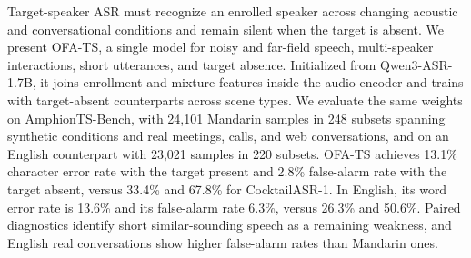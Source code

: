 Target-speaker ASR must recognize an enrolled speaker across changing acoustic and conversational conditions and remain silent when the target is absent.
We present OFA-TS, a single model for noisy and far-field speech, multi-speaker interactions, short utterances, and target absence.
Initialized from Qwen3-ASR-1.7B, it joins enrollment and mixture features inside the audio encoder and trains with target-absent counterparts across scene types.
We evaluate the same weights on AmphionTS-Bench, with 24,101 Mandarin samples in 248 subsets spanning synthetic conditions and real meetings, calls, and web conversations, and on an English counterpart with 23,021 samples in 220 subsets.
OFA-TS achieves 13.1\% character error rate with the target present and 2.8\% false-alarm rate with the target absent, versus 33.4\% and 67.8\% for CocktailASR-1.
In English, its word error rate is 13.6\% and its false-alarm rate 6.3\%, versus 26.3\% and 50.6\%.
Paired diagnostics identify short similar-sounding speech as a remaining weakness, and English real conversations show higher false-alarm rates than Mandarin ones.
